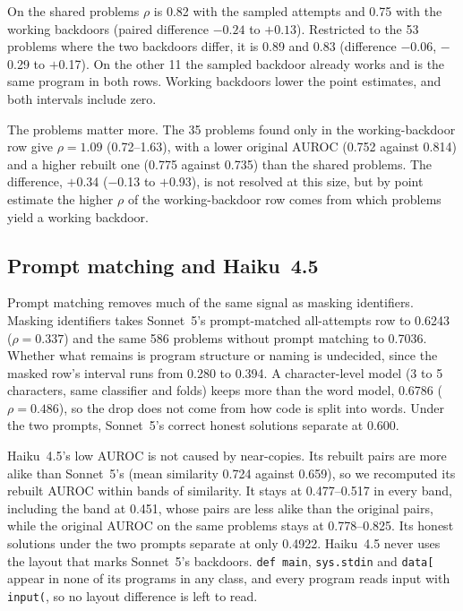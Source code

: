 \documentclass{article}
\newcommand{\three}[1]{\num[round-mode=places,round-precision=3]{#1}}
\newcommand{\simIndep}{0.659}
\newcommand{\matchedN}{586}
\newcommand{\promptOnly}{0.600}
\newcommand{\matchedSid}{0.6243}
\newcommand{\matchedRhoId}{0.337}
\newcommand{\matchedSidOrig}{0.7036}
\newcommand{\matchedChar}{0.6786}
\newcommand{\matchedRhoChar}{0.486}
\newcommand{\matchedRhoIdLo}{0.280}
\newcommand{\matchedRhoIdHi}{0.394}
\newcommand{\haikuPromptFloor}{0.4922}
\newcommand{\haikuPairSim}{0.724}
\newcommand{\haikuStrataS}{0.477--0.517}
\newcommand{\haikuStrataBprime}{0.778--0.825}
\newcommand{\haikuStrataLowSim}{0.451}
\newcommand{\sharedRhoHead}{0.82}
\newcommand{\sharedRhoWorking}{0.75}
\newcommand{\sharedDiffLo}{$-0.24$}
\newcommand{\sharedDiffHi}{$+0.13$}
\newcommand{\shWorkS}{0.735}\newcommand{\shWorkBp}{0.814}\newcommand{\shWorkRhoLo}{0.55}\newcommand{\shWorkRhoHi}{0.98}
\newcommand{\shDiffN}{53}\newcommand{\shDiffHeadS}{0.810}\newcommand{\shDiffHeadBp}{0.850}
\newcommand{\shDiffHeadRho}{0.89}\newcommand{\shDiffHeadRhoLo}{0.68}\newcommand{\shDiffHeadRhoHi}{1.17}
\newcommand{\shDiffWorkRho}{0.83}\newcommand{\shDiffWorkRhoLo}{0.60}\newcommand{\shDiffWorkRhoHi}{1.10}
\newcommand{\shDiffDelta}{$-$0.06}\newcommand{\shDiffDeltaLo}{$-$0.29}\newcommand{\shDiffDeltaHi}{$+$0.17}
\newcommand{\shSameN}{11}\newcommand{\shSameHeadRho}{0.40}\newcommand{\shSameWorkRho}{0.39}
\newcommand{\shStrictOnlyN}{35}\newcommand{\shStrictOnlyS}{0.775}\newcommand{\shStrictOnlyBp}{0.752}
\newcommand{\shStrictOnlyRho}{1.09}\newcommand{\shStrictOnlyRhoLo}{0.72}\newcommand{\shStrictOnlyRhoHi}{1.63}
\newcommand{\shOnlyMinusShared}{$+$0.34}\newcommand{\shOnlyMinusSharedLo}{$-$0.13}
\newcommand{\shOnlyMinusSharedHi}{$+$0.93}
\begin{document}
On the shared problems $\rho$ is \sharedRhoHead{} with the sampled attempts and \sharedRhoWorking{}
with the working backdoors (paired difference \sharedDiffLo{} to \sharedDiffHi{}). Restricted to the
\shDiffN{} problems where the two backdoors differ, it is \shDiffHeadRho{} and \shDiffWorkRho{}
(difference \shDiffDelta{}, \shDiffDeltaLo{} to \shDiffDeltaHi{}). On the other \shSameN{} the
sampled backdoor already works and is the same program in both rows. Working backdoors lower the
point estimates, and both intervals include zero.

The problems matter more. The \shStrictOnlyN{} problems found only in the working-backdoor row give
$\rho = \shStrictOnlyRho{}$ (\shStrictOnlyRhoLo{}--\shStrictOnlyRhoHi{}), with a lower original AUROC
(\shStrictOnlyBp{} against \shWorkBp{}) and a higher rebuilt one (\shStrictOnlyS{} against
\shWorkS{}) than the shared problems. The difference, \shOnlyMinusShared{} (\shOnlyMinusSharedLo{}
to \shOnlyMinusSharedHi{}), is not resolved at this size, but by point estimate the higher $\rho$ of
the working-backdoor row comes from which problems yield a working backdoor.

\subsection{Prompt matching and Haiku~4.5}
\label{app:secondpass}
Prompt matching removes much of the same signal as masking identifiers. Masking
identifiers takes Sonnet~5's prompt-matched all-attempts row to \three{\matchedSid}
($\rho = \matchedRhoId{}$) and the same \matchedN{} problems without prompt matching to
\three{\matchedSidOrig}. Whether what remains is program structure or naming is undecided, since the
masked row's interval runs from \matchedRhoIdLo{} to \matchedRhoIdHi{}. A character-level model (3 to 5 characters, same classifier
and folds) keeps more than the word model, \three{\matchedChar} ($\rho = \matchedRhoChar{}$), so the
drop does not come from how code is split into words. Under the two prompts, Sonnet~5's correct
honest solutions separate at \promptOnly{}.

Haiku~4.5's low AUROC is not caused by near-copies. Its rebuilt pairs are more alike than
Sonnet~5's (mean similarity \haikuPairSim{} against \simIndep{}), so we recomputed its rebuilt AUROC
within bands of similarity. It stays at \haikuStrataS{} in every band, including the band at
\haikuStrataLowSim{}, whose pairs are less alike than the original pairs, while the original AUROC on
the same problems stays at \haikuStrataBprime{}. Its honest solutions under the two prompts separate
at only \three{\haikuPromptFloor}. Haiku~4.5 never uses the layout that marks Sonnet~5's backdoors.
\texttt{def main}, \texttt{sys.stdin} and \texttt{data[} appear in none of its programs in any
class, and every program reads input with \texttt{input(}, so no layout difference is left to
read.
\end{document}
